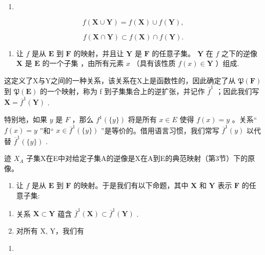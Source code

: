 \begin{enumerate}
\def\labelenumi{(\arabic{enumi})}
\setcounter{enumi}{10}
\tightlist
\item
\end{enumerate}

\[
f (\mathbf {X} \cup \mathbf {Y}) = f (\mathbf {X}) \cup f (\mathbf {Y}),\tag{12}
\]

\[
f (\mathbf {X} \cap \mathbf {Y}) \subset f (\mathbf {X}) \cap f (\mathbf {Y}).
\]

\begin{enumerate}
\def\labelenumi{\arabic{enumi}.}
\setcounter{enumi}{5}
\tightlist
\item
  让 \(f\) 是从 \(\mathbf{E}\) 到 \(\mathbf{F}\) 的映射，并且让 \(\mathbf{Y}\) 是 \(\mathbf{F}\) 的任意子集。 \(\mathbf{Y}\) 在 \(f\) 之下的逆像 \(\mathbf{X}\) 是 \(\mathbf{E}\) 的一个子集 ，由所有元素 \(x\) （具有该性质 \(f(x) \in \mathbf{Y}\) ）组成.
\end{enumerate}

这定义了X与Y之间的一种关系，该关系在X上是函数性的，因此确定了从 \(\mathfrak{P}(\mathbf{F})\) 到 \(\mathfrak{P}(\mathbf{E})\) 的一个映射，称为 f 到子集集合上的逆扩张，并记作 \(\overline{f}^{1}\) ；因此我们写 \(\mathbf{X} = \overline{f}^{1}(\mathbf{Y})\) .

特别地，如果 \(y\) 是 \(F\) ，那么 \(f^{1}(\{y\})\) 将是所有 \(x \in E\) 使得 \(f(x) = y\) 。关系“ \(f(x) = y\) ”和“ \(x \in \overline{f}^{1}(\{y\})\) ”是等价的。借用语言习惯，我们常写 \(\overline{f}^{1}(y)\) 以代替 \(\overline{f}^{1}(\{y\})\) .

迹 \(X_{A}\) 子集X在E中对给定子集A的逆像是X在A到E的典范映射（第3节）下的原像。

\begin{enumerate}
\def\labelenumi{\arabic{enumi}.}
\setcounter{enumi}{6}
\tightlist
\item
  让 \(f\) 是从 \(\mathbf{E}\) 到 \(\mathbf{F}\) 的映射。于是我们有以下命题，其中 \(\mathbf{X}\) 和 \(\mathbf{Y}\) 表示 \(\mathbf{F}\) 的任意子集:
\end{enumerate}

\begin{enumerate}
\def\labelenumi{(\alph{enumi})}
\item
  关系 \(\mathbf{X} \subset \mathbf{Y}\) 蕴含 \(\overline{f}^1(\mathbf{X}) \subset \overline{f}^1(\mathbf{Y})\) .
\item
  对所有 X, Y，我们有
\end{enumerate}

\begin{enumerate}
\def\labelenumi{(\arabic{enumi})}
\setcounter{enumi}{12}
\tightlist
\item
\end{enumerate}

